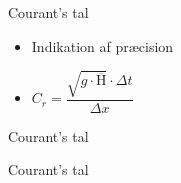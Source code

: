 \begin{frame}{Courant's tal}{}
\vfill\vfill\centering

\begin{itemize}
	\item<1-> Indikation af præcision  
	\item<2-> $C_r =  \dfrac{\sqrt{g \cdot \overline{\text{H}}} \cdot \Delta t}{\Delta x}$ 
\end{itemize}

\vfill\vfill		
\end{frame}

\begin{frame}{Courant's tal}{}
\vfill\vfill\centering
\begin{figure}[H]
  
\end{figure}
\vfill\vfill		
\end{frame}

\begin{frame}{Courant's tal}{}
\vfill\vfill\centering
\begin{figure}[H]
  
\end{figure}
\vfill\vfill		
\end{frame}



